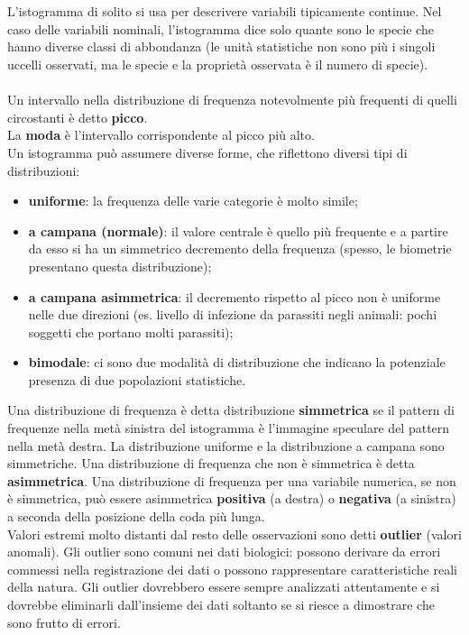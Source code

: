 \documentclass[drafts, 10pt]{book}
\begin{document}
\\
\\
L’istogramma di solito si usa per descrivere variabili tipicamente continue. Nel caso delle variabili nominali, l’istogramma dice solo quante sono le specie che hanno diverse classi di abbondanza (le unità statistiche non sono più i singoli uccelli osservati, ma le specie e la proprietà osservata è il numero di specie).
\\
\\
Un intervallo nella distribuzione di frequenza notevolmente più frequenti di quelli circostanti è detto \textbf{picco}.
\\
La \textbf{moda} è l'intervallo corrispondente al picco più alto.
\\
Un istogramma può assumere diverse forme, che riflettono diversi tipi di distribuzioni:
\begin{itemize}
    \item \textbf{uniforme}: la frequenza delle varie categorie è molto simile;
    \item \textbf{a campana (normale)}: il valore centrale è quello più frequente e a partire da esso si ha un simmetrico decremento della frequenza (spesso, le biometrie presentano questa distribuzione);
    \item \textbf{a campana asimmetrica}: il decremento rispetto al picco non è uniforme nelle due direzioni (es. livello di infezione da parassiti negli animali: pochi soggetti che portano molti parassiti);
    \item \textbf{bimodale}: ci sono due modalità di distribuzione che indicano la potenziale presenza di due popolazioni statistiche.
\end{itemize}
Una distribuzione di frequenza è detta distribuzione \textbf{simmetrica} se il pattern di frequenze nella metà sinistra del istogramma è l'immagine speculare del pattern nella metà destra. La distribuzione uniforme e la distribuzione a campana sono simmetriche. Una distribuzione di frequenza che non è simmetrica è detta \textbf{asimmetrica}. Una distribuzione di frequenza per una variabile numerica, se non è simmetrica, può essere asimmetrica \textbf{positiva} (a destra) o \textbf{negativa} (a sinistra) a seconda della posizione della coda più lunga.
\\
Valori estremi molto distanti dal resto delle osservazioni sono detti \textbf{outlier} (valori anomali). Gli outlier sono comuni nei dati biologici: possono derivare da errori commessi nella registrazione dei dati o possono rappresentare caratteristiche reali della natura. Gli outlier dovrebbero essere sempre analizzati attentamente e si dovrebbe eliminarli dall'insieme dei dati soltanto se si riesce a dimostrare che sono frutto di errori.
\end{document}
